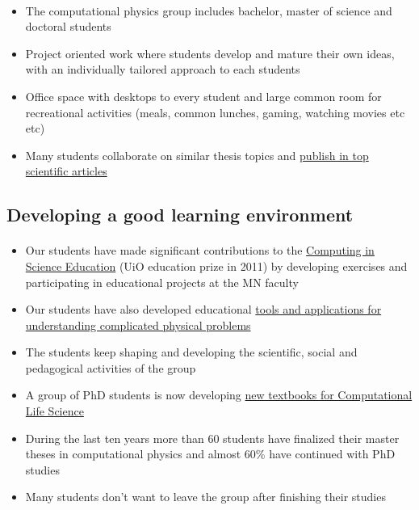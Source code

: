 \documentclass[%
oneside,                 %
final,                   %
10pt]{article}
\begin{document}
\paragraph{}
\begin{itemize}
\item The computational physics group includes bachelor, master of science and doctoral students

\item Project oriented work where students develop and mature their own ideas, with an individually tailored approach to each students

\item Office space with desktops to every student and large common room for recreational activities (meals, common lunches, gaming, watching movies etc etc)

\item Many students collaborate on similar  thesis topics and \href{{http://www.dn.no/talent/2014/06/12/Utdannelse/sommervikar-ble-toppforsker}}{publish in top scientific articles}
\end{itemize}

\noindent





\subsection{Developing a good learning environment}

\paragraph{}
\begin{itemize}
\item Our students have made significant contributions to  the \href{{http://www.mn.uio.no/english/about/collaboration/cse/}}{Computing in Science Education}  (UiO education prize in 2011) by developing exercises and participating in educational projects at the MN faculty

\item Our students have also developed educational \href{{http://www.mn.uio.no/fysikk/om/aktuelt/aktuelle-saker/2015/realfagsapper.html}}{tools and applications for understanding complicated physical problems} 

\item The students keep shaping and developing the scientific, social and pedagogical activities of the group

\item A group of PhD students is now developing \href{{https://github.com/CINPLA/ibvcse}}{new textbooks for Computational Life Science}

\item During the last ten years more than 60 students have finalized their master theses in computational physics and  almost 60\% have continued with PhD studies

\item Many students don't want to leave the group after finishing their studies
\end{itemize}
\end{document}
